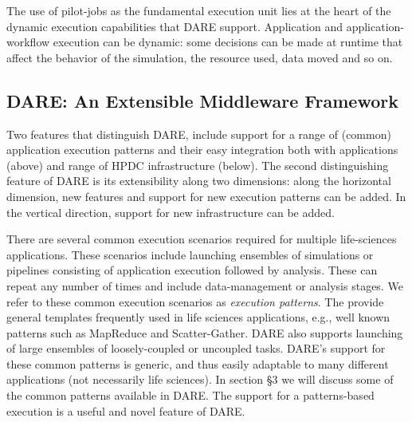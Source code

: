 \documentclass[]{svjour3}
\begin{document}
The use of pilot-jobs as the fundamental execution unit lies at the
heart of the dynamic execution capabilities that DARE
support. Application and application-workflow execution can be
dynamic: some decisions can be made at runtime that affect the
behavior of the simulation, the resource used, data moved and so on.


\subsection{DARE: An Extensible Middleware Framework}




Two features that distinguish DARE, include support for a range of
(common) application execution patterns and their easy integration
both with applications (above) and range of HPDC infrastructure
(below). The second distinguishing feature of DARE is its
extensibility along two dimensions: along the horizontal
dimension, new features and support for new execution patterns can be
added. In the vertical direction, support for new infrastructure can
be added.  

There are several common execution scenarios required for multiple
life-sciences applications. These scenarios include launching
ensembles of simulations or pipelines consisting of application
execution followed by analysis.  These can repeat any number of times
and include data-management or analysis stages. We refer to these
common execution scenarios as {\it execution patterns}. The provide
general templates frequently used in life sciences applications, e.g.,
well known patterns such as MapReduce and Scatter-Gather. DARE also
supports launching of large ensembles of loosely-coupled or uncoupled
tasks.  DARE's support for these common patterns is generic, and thus
easily adaptable to many different applications (not necessarily life
sciences).  In section \S3 we will discuss some of the common patterns
available in DARE. The support for a patterns-based execution is a
useful and novel feature of DARE.
\end{document}
